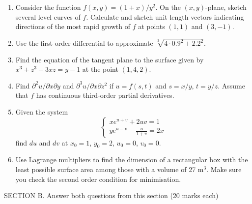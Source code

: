 \documentclass[12pt]{article} %
\theoremstyle{definition} %
\begin{document}
\begin{enumerate}

\item Consider the function $f(x,y)=(1+x)/y^2$. On the $(x,y)$-plane, sketch several level curves of $f$. Calculate and sketch unit length vectors indicating directions of the most rapid growth of $f$ at points $(1, 1)$ and $(3, -1)$.

\item Use the first-order differential to approximate
$\sqrt[3]{4\cdot 0.9^2+2.2^2}$.

\item Find the equation of the tangent plane to the surface given by $x^3+z^3-3xz=y-1$ at the point $(1, 4, 2)$.

\item Find $\partial^2 u / \partial x \partial y$ and $\partial^3 u / \partial x \partial z^2$ if $u=f(s,t)$ and $s=x/y$, $t=y/z$. Assume that $f$ has continuous third-order partial derivatives.

\item Given the system
\[
\begin{cases}
xe^{u+v}+2uv=1 \\
ye^{u-v}-\frac{u}{1+v}=2x
\end{cases}
\]
find $du$ and $dv$ at $x_0 = 1$, $y_0 = 2$, $u_0 = 0$, $v_0 = 0$.

\item Use Lagrange multipliers to find the dimension of a rectangular box with the least
possible surface area among those with a volume of 27 m$^3$. Make sure you check the second
order condition for minimisation.
\end{enumerate}

SECTION B. Answer both questions from this section (20 marks each)
\end{document}
